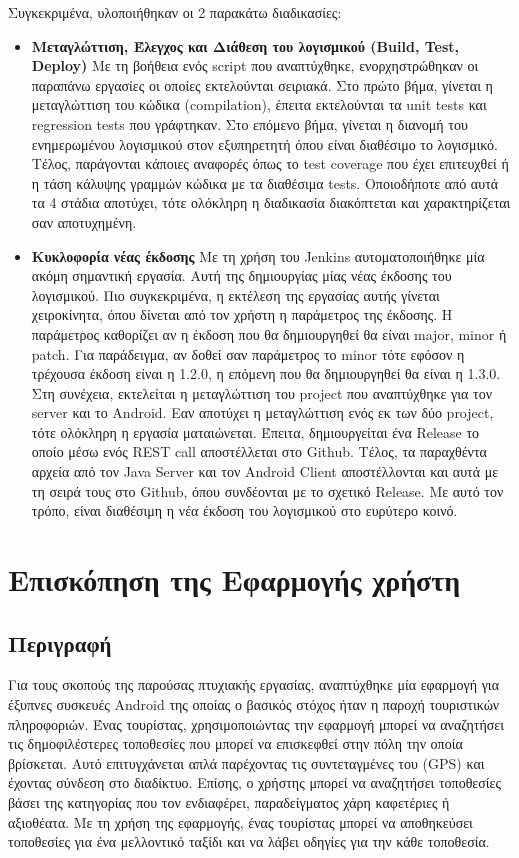 \documentclass[oneside, 12pt]{book}
\begin{document}
Συγκεκριμένα, υλοποιήθηκαν οι 2 παρακάτω διαδικασίες:
\begin{itemize}
    \item \textbf{Μεταγλώττιση, Έλεγχος και Διάθεση του λογισμικού (Build, Test, Deploy)}
    Με τη βοήθεια ενός script που αναπτύχθηκε, ενορχηστρώθηκαν οι παραπάνω εργασίες οι οποίες εκτελούνται σειριακά.
    Στο πρώτο βήμα, γίνεται η μεταγλώττιση του κώδικα (compilation), 
    έπειτα εκτελούνται τα unit tests και regression tests που γράφτηκαν.
    Στο επόμενο βήμα, γίνεται η διανομή του ενημερωμένου λογισμικού 
    στον εξυπηρετητή όπου είναι διαθέσιμο το λογισμικό.
    Τέλος, παράγονται κάποιες αναφορές όπως το test coverage που έχει επιτευχθεί ή η τάση κάλυψης γραμμών κώδικα με τα 
    διαθέσιμα tests.
    Οποιοδήποτε από αυτά τα 4 στάδια αποτύχει, τότε ολόκληρη η 
    διαδικασία διακόπτεται και χαρακτηρίζεται σαν αποτυχημένη.
    \item \textbf{Κυκλοφορία νέας έκδοσης}
    Με τη χρήση του Jenkins αυτοματοποιήθηκε μία ακόμη σημαντική 
    εργασία. Αυτή της δημιουργίας μίας νέας έκδοσης του λογισμικού.
    Πιο συγκεκριμένα, η εκτέλεση της εργασίας αυτής γίνεται 
    χειροκίνητα, όπου δίνεται από τον χρήστη η παράμετρος της έκδοσης.
    Η παράμετρος καθορίζει αν η έκδοση που θα δημιουργηθεί θα είναι 
    major, minor ή patch. Για παράδειγμα, αν δοθεί σαν παράμετρος το 
    minor τότε εφόσον η τρέχουσα έκδοση είναι η 1.2.0, η επόμενη που 
    θα δημιουργηθεί θα είναι η 1.3.0. Στη συνέχεια, εκτελείται η 
    μεταγλώττιση του project που αναπτύχθηκε για τον server και το 
    Android. Εαν αποτύχει η μεταγλώττιση ενός εκ των δύο project, τότε 
    ολόκληρη η εργασία ματαιώνεται. Έπειτα, δημιουργείται ένα Release 
    το οποίο μέσω ενός REST call αποστέλλεται στο Github.
    Τέλος, τα παραχθέντα αρχεία από τον Java Server και τον Android 
    Client αποστέλλονται και αυτά με τη σειρά τους στο Github, όπου 
    συνδέονται με το σχετικό Release.
    Με αυτό τον τρόπο, είναι διαθέσιμη η νέα έκδοση του λογισμικού στο ευρύτερο κοινό.
\end{itemize}

\chapter{Επισκόπηση της Εφαρμογής χρήστη}
\section{Περιγραφή}
Για τους σκοπούς της παρούσας πτυχιακής εργασίας, αναπτύχθηκε μία 
εφαρμογή για έξυπνες συσκευές Android της οποίας ο βασικός στόχος ήταν 
η παροχή τουριστικών πληροφοριών.
Ένας τουρίστας, χρησιμοποιώντας την εφαρμογή μπορεί να αναζητήσει τις 
δημοφιλέστερες τοποθεσίες που μπορεί να επισκεφθεί στην πόλη την οποία 
βρίσκεται. Αυτό επιτυγχάνεται απλά παρέχοντας τις συντεταγμένες του (GPS) και έχοντας σύνδεση στο διαδίκτυο.
Επίσης, ο χρήστης μπορεί να αναζητήσει τοποθεσίες βάσει της κατηγορίας 
που τον ενδιαφέρει, παραδείγματος χάρη καφετέριες ή αξιοθέατα.
Με τη χρήση της εφαρμογής, ένας τουρίστας μπορεί να αποθηκεύσει 
τοποθεσίες για ένα μελλοντικό ταξίδι και να λάβει οδηγίες για την κάθε 
τοποθεσία.
\end{document}
